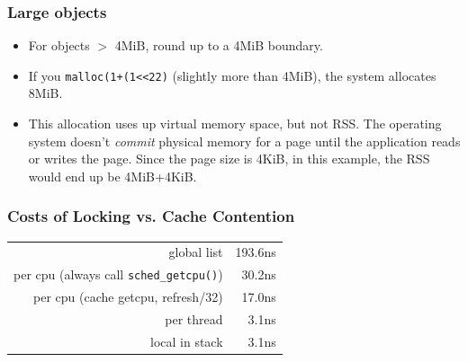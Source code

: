 \documentclass[xcolor=dvipsnames,14pt]{beamer}
\begin{document}
\begin{frame}
\frametitle{Large objects}
\begin{itemize}
\item For objects $>$ 4MiB, round up to a 4MiB boundary.
\item If you \texttt{malloc(1+(1<<22)} (slightly more than 4MiB), the system allocates 8MiB.  
\item This allocation uses up virtual memory space, but not RSS\@.
  The operating system doesn't \textit{commit} physical memory for a
  page until the application reads or writes the page.  Since the page
  size is 4KiB, in this example, the RSS would end up be 4MiB+4KiB.
\end{itemize}
\end{frame}

\begin{frame}
\frametitle{Costs of Locking vs. Cache Contention}

\begin{tabular}{rr}
                                                     global list &    193.6ns \\
            per cpu (always call \texttt{sched_getcpu()})  &     30.2ns \\
per cpu (cache getcpu, refresh/32) &     17.0ns \\
                                                      per thread &      3.1ns \\
                                                  local in stack &      3.1ns \\
\end{tabular}
\end{frame}






\end{document}
